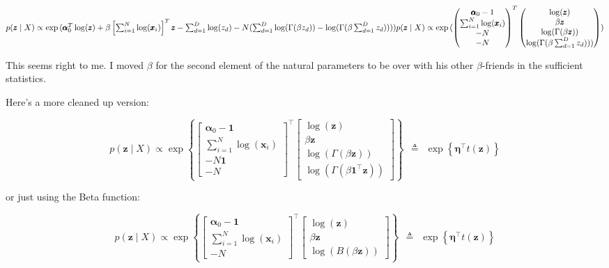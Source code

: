 \documentclass{article}
\begin{document}
\begin{math}
p(\pmb{z} \mid X) \propto \exp{(\pmb{\alpha}_0^T \log(\pmb{z}) + \beta  \left[\sum_{i=1}^N \log(\pmb{x}_i) \right]^T \pmb{z} - \sum_{d=1}^D \log(z_d) - N(\sum_{d=1}^{D} \log (\Gamma (\beta z_{d})) - \log (\Gamma (\beta \sum_{d=1}^D z_{d}))))} \\
p(\pmb{z} \mid X) \propto \exp{(\begin{pmatrix} \pmb{\alpha}_0 - 1 \\  \sum_{i=1}^N \log(\pmb{x}_i)  \\ -N \\ -N \end{pmatrix}^T \begin{pmatrix} \log(\pmb{z}) \\ \beta \pmb{z} \\ \log (\Gamma( \beta \pmb{z})) \\ \log (\Gamma (\beta \sum_{d=1}^D z_{d}))) \end{pmatrix})}
\end{math}

This seems right to me.  I moved $\beta$ for the second element of the natural parameters to be over with his other $\beta$-friends in the sufficient statistics.

Here's a more cleaned up version:

$$
p(\pmb{z} \mid X) \propto \exp\left\{\begin{bmatrix} \pmb{\alpha}_0 - \pmb{1} \\  \sum_{i=1}^N \log(\pmb{x}_i)  \\ -N \pmb{1} \\ -N \end{bmatrix}^\top \begin{bmatrix} \log(\pmb{z}) \\ \beta \pmb{z} \\ \log (\Gamma( \beta \pmb{z})) \\ \log (\Gamma (\beta \pmb{1}^\top \pmb{z}))\end{bmatrix} \right\}  ~~\triangleq~~ \exp\left\{ \pmb{\eta}^\top t(\pmb{z}) \right\}
$$

or just using the Beta function:

$$
p(\pmb{z} \mid X) \propto \exp\left\{\begin{bmatrix} \pmb{\alpha}_0 - \pmb{1} \\  \sum_{i=1}^N \log(\pmb{x}_i)  \\ -N  \end{bmatrix}^\top \begin{bmatrix} \log(\pmb{z}) \\ \beta \pmb{z} \\ \log (B( \beta \pmb{z})) \end{bmatrix} \right\}  ~~\triangleq~~ \exp\left\{ \pmb{\eta}^\top t(\pmb{z}) \right\}
$$
\end{document}
